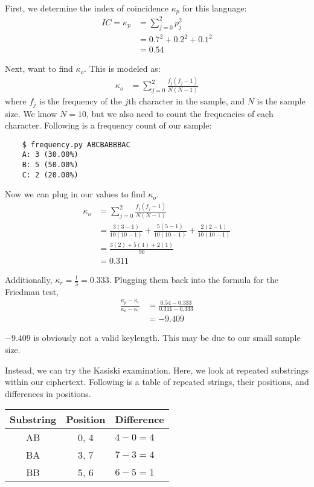 \documentclass[10pt,letterpaper]{report}
\begin{document}
\begin{enumerate}
	First, we determine the index of coincidence $\kappa_p$ for this language:
	\begin{align*}
	IC = \kappa_p &= \sum\limits_{j=0}^{2} p_j^2 \\
	&= 0.7^2 + 0.2^2 + 0.1^2 \\
	&= 0.54
	\end{align*}

	
	Next, want to find $\kappa_o$. This is modeled as:
	\begin{align*}
	\kappa_o &= \sum\limits_{j=0}^{2} \frac{f_j(f_j - 1)}{N(N-1)}
	\end{align*}
	where $f_j$ is the frequency of the $j$th character in the sample, and $N$ is the
	sample size. We know $N=10$, but we also need to count the frequencies of each
	character. Following is a frequency count of our sample:
	\begin{verbatim}
	$ frequency.py ABCBABBBAC
	A: 3 (30.00%)
	B: 5 (50.00%)
	C: 2 (20.00%)
	\end{verbatim}
	
	Now we can plug in our values to find $\kappa_o$.
	\begin{align*}
	\kappa_o &= \sum\limits_{j=0}^{2} \frac{f_j(f_j - 1)}{N(N-1)} \\
	&= \frac{3(3-1)}{10(10-1)} + \frac{5(5-1)}{10(10-1)} + \frac{2(2-1)}{10(10-1)} \\
	&= \frac{3(2)+5(4)+2(1)}{90} \\ 
	&= 0.311
	\end{align*}
	
	Additionally, $\kappa_r = \frac{1}{3} = 0.333$. Plugging them back into the formula for the Friedman test,
	\begin{align*}
	\frac{\kappa_p - \kappa_r}{\kappa_o - \kappa_r} &= \frac{0.54 - 0.333}{0.311-0.333}
	\\ &= -9.409
	\end{align*}
	
	$-9.409$ is obviously not a valid keylength. This may be due to our small sample size.
	\par
	Instead, we can try the Kasiski examination. Here, we look at repeated substrings
	within our ciphertext. Following is a table of repeated strings, their positions, and
	differences in positions.
	
	\begin{center}
	\begin{tabular}{ | c | c | l |}
	\hline
	Substring & Position & Difference   \\ \hline
	AB & 0, 4 & $4-0=4$ \\
	BA & 3, 7 & $7-3=4$ \\
	BB & 5, 6 & $6-5=1$ \\
	\hline
	\end{tabular}
	\end{center}
	

\end{enumerate}
\end{document}
